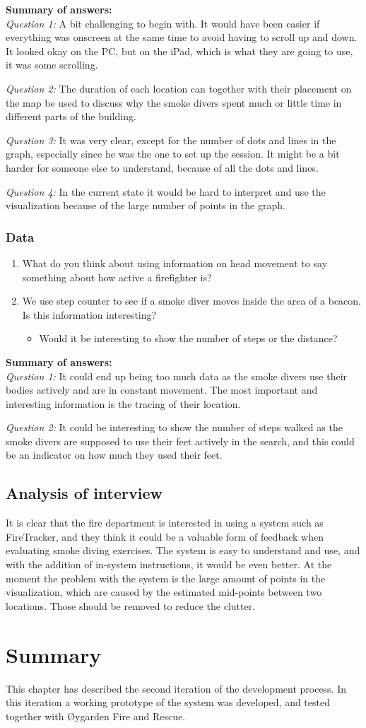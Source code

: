 \documentclass[../Main/thesis.tex]{subfiles}
\begin{document}
\textbf{Summary of answers:}\\
\textit{Question 1:}
A bit challenging to begin with.
It would have been easier if everything was onscreen at the same time to avoid having to scroll up and down.
It looked okay on the PC, but on the iPad, which is what they are going to use, it was some scrolling.

\textit{Question 2:}
The duration of each location can together with their placement on the map be used to discuss why the smoke divers spent much or little time in different parts of the building.

\textit{Question 3:}
It was very clear, except for the number of dots and lines in the graph, especially since he was the one to set up the session.
It might be a bit harder for someone else to understand, because of all the dots and lines.

\textit{Question 4:}
In the current state it would be hard to interpret and use the visualization because of the large number of points in the graph.


\subsubsection*{Data}
\begin{enumerate}
	\item What do you think about using information on head movement to say something about how active a firefighter is?
	\item We use step counter to see if a smoke diver moves inside the area of a beacon. Is this information interesting?
	\begin{itemize}
		\item Would it be interesting to show the number of steps or the distance?
	\end{itemize}
\end{enumerate}

\textbf{Summary of answers:}\\
\textit{Question 1:}
It could end up being too much data as the smoke divers use their bodies actively and are in constant movement.
The most important and interesting information is the tracing of their location.

\textit{Question 2:}
It could be interesting to show the number of steps walked as the smoke divers are supposed to use their feet actively in the search, and this could be an indicator on how much they used their feet.

\subsection{Analysis of interview}
It is clear that the fire department is interested in using a system such as FireTracker, and they think it could be a valuable form of feedback when evaluating smoke diving exercises.
The system is easy to understand and use, and with the addition of in-system instructions, it would be even better.
At the moment the problem with the system is the large amount of points in the visualization, which are caused by the estimated mid-points between two locations.
Those should be removed to reduce the clutter.

\section{Summary}
This chapter has described the second iteration of the development process.
In this iteration a working prototype of the system was developed, and tested together with Øygarden Fire and Rescue.
\end{document}
